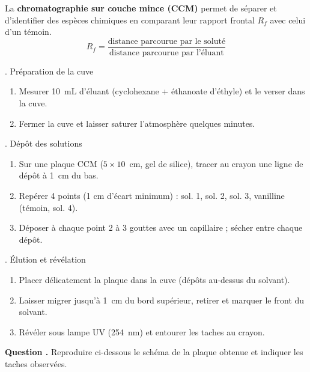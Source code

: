 \documentclass[11pt,a4paper]{article}
\newcommand{\subsectitle}[1]{%
  \vspace{4pt}
  \noindent\colorbox{exolight}{\parbox{\dimexpr\linewidth-2\fboxsep}%
    {\color{exoheader}\bfseries\strut\quad #1}}
  \vspace{2pt}
}
\newcounter{question}
\newcommand{\question}{%
  \stepcounter{question}%
  \noindent\textcolor{exoheader}{\textbf{Question \thequestion.}}\quad
}
\begin{document}
\begin{mdframed}[backgroundcolor=exolight, linecolor=exoheader, linewidth=1.2pt]
La \textbf{chromatographie sur couche mince (CCM)} permet de séparer et d'identifier
des espèces chimiques en comparant leur rapport frontal $R_f$ avec celui d'un témoin.
\[
  R_f = \frac{\text{distance parcourue par le soluté}}{\text{distance parcourue par l'éluant}}
\]
\end{mdframed}

\vspace{4pt}
\subsectitle{1. Préparation de la cuve}

\begin{enumerate}[leftmargin=1.5cm, label=\textcolor{exoheader}{\textbf{\arabic*.}}]
  \item Mesurer 10~mL d'éluant (cyclohexane + éthanoate d'éthyle) et le verser dans la cuve.
  \item Fermer la cuve et laisser saturer l'atmosphère quelques minutes.
\end{enumerate}

\vspace{4pt}
\subsectitle{2. Dépôt des solutions}

\begin{enumerate}[leftmargin=1.5cm, label=\textcolor{exoheader}{\textbf{\arabic*.}}]
  \item Sur une plaque CCM ($5 \times 10$~cm, gel de silice), tracer au crayon une ligne de dépôt à 1~cm du bas.
  \item Repérer 4 points (1 cm d'écart minimum) : sol. 1, sol. 2, sol. 3, vanilline (témoin, sol. 4).
  \item Déposer à chaque point 2 à 3 gouttes avec un capillaire ; sécher entre chaque dépôt.
\end{enumerate}

\vspace{4pt}
\subsectitle{3. Élution et révélation}

\begin{enumerate}[leftmargin=1.5cm, label=\textcolor{exoheader}{\textbf{\arabic*.}}]
  \item Placer délicatement la plaque dans la cuve (dépôts au-dessus du solvant).
  \item Laisser migrer jusqu'à 1~cm du bord supérieur, retirer et marquer le front du solvant.
  \item Révéler sous lampe UV (254~nm) et entourer les taches au crayon.
\end{enumerate}

\vspace{4pt}
\question Reproduire ci-dessous le schéma de la plaque obtenue et indiquer les taches observées.
\end{document}
